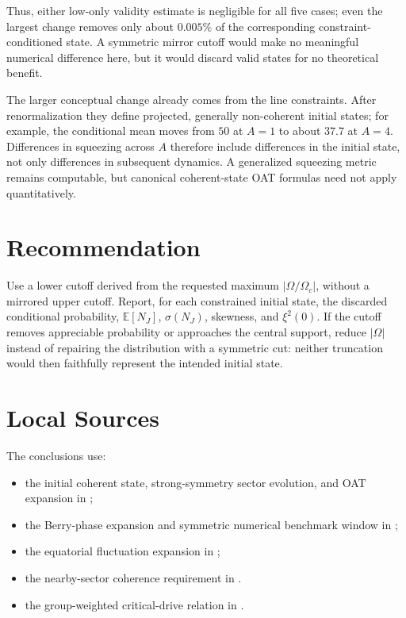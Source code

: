 \documentclass[11pt]{article}
\begin{document}
Thus, either low-only validity estimate is negligible for all five cases;
even the largest change removes only about $0.005\%$ of the corresponding
constraint-conditioned state.  A symmetric mirror cutoff would make no
meaningful numerical difference here, but it would discard valid states for
no theoretical benefit.

The larger conceptual change already comes from the line constraints.  After
renormalization they define projected, generally non-coherent initial states;
for example, the conditional mean moves from $50$ at $A=1$ to about $37.7$ at
$A=4$.  Differences in squeezing across $A$ therefore include differences in
the initial state, not only differences in subsequent dynamics.  A generalized
squeezing metric remains computable, but canonical coherent-state OAT formulas
need not apply quantitatively.

\section{Recommendation}

Use a lower cutoff derived from the requested maximum
$\lvert\Omega/\Omega_c\rvert$, without a mirrored upper cutoff.  Report, for
each constrained initial state, the discarded conditional probability,
$\mathbb E[N_J]$, $\sigma(N_J)$, skewness, and $\xi^2(0)$.  If the cutoff
removes appreciable probability or approaches the central support, reduce
$\lvert\Omega\rvert$ instead of repairing the distribution with a symmetric
cut: neither truncation would then faithfully represent the intended initial
state.

\section{Local Sources}

The conclusions use:
\begingroup
\raggedright
\begin{itemize}
  \item the initial coherent state, strong-symmetry sector evolution, and OAT
    expansion in ;
  \item the Berry-phase expansion and symmetric numerical benchmark window in
    ;
  \item the equatorial fluctuation expansion in
    ;
  \item the nearby-sector coherence requirement in
    .
  \item the group-weighted critical-drive relation in
    .
\end{itemize}
\endgroup
\end{document}
